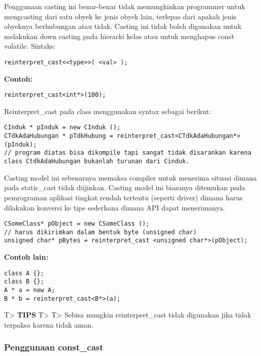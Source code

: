 Penggunaan casting ini benar-benar tidak memungkinkan programmer untuk
mengcasting dari satu obyek ke jenis obyek lain, terlepas dari apakah
jenis obyeknya berhubungan atau tidak. Casting ini tidak boleh digunakan
untuk melakukan down casting pada hierarki kelas atau untuk menghapus
const volatile. Sintaks:

\begin{verbatim}
reinterpret_cast<<type>>( <val> );
\end{verbatim}

\textbf{Contoh:}

\begin{verbatim}
reinterpret_cast<int*>(100);
\end{verbatim}

Reinterpret\_cast pada class menggunakan syntax sebagai berikut:

\begin{verbatim}
CInduk * pInduk = new CInduk ();
CTdkAdaHubungan * pTdkHubung = reinterpret_cast<CTdkAdaHubungan*>(pInduk);
// program diatas bisa dikompile tapi sangat tidak disarankan karena class CtdkAdaHubungan bukanlah turunan dari Cinduk.
\end{verbatim}

Casting model ini sebenarnya memaksa compiler untuk menerima situasi
dimana pada static\_cast tidak diijinkan. Casting model ini biasanya
ditemukan pada pemrograman aplikasi tingkat rendah tertentu (seperti
driver) dimana harus dilakukan konversi ke tipe sederhana dimana API
dapat menerimanya.

\begin{verbatim}
CSomeClass* pObject = new CSomeClass ();
// harus dikirimkan dalam bentuk byte (unsigned char)
unsigned char* pBytes = reinterpret_cast <unsigned char*>(pObject);
\end{verbatim}

\textbf{Contoh lain:}

\begin{verbatim}
class A {};
class B {};
A * a = new A;
B * b = reinterpret_cast<B*>(a);
\end{verbatim}

T\textgreater{} \textbf{TIPS} T\textgreater{} T\textgreater{} Sebisa
mungkin reinterpret\_cast tidak digunakan jika tidak terpaksa karena
tidak aman.

\subsubsection{Penggunaan const\_cast}\label{penggunaan-constux5fcast}

